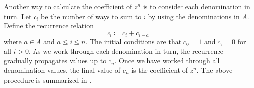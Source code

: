 Another way to calculate the coefficient of $z^n$ is to consider each
denomination in turn.  Let $c_i$ be the number of ways to sum to $i$
by using the denominations in $A$.  Define the recurrence relation
\begin{equation}
\label{eqn:sum2:recurrence_relation}
c_i
\coloneqq
c_i + c_{i-a}
\end{equation}
where $a \in A$ and $a \leq i \leq n$.  The initial conditions are
that $c_0 = 1$ and $c_i = 0$ for all $i > 0$.  As we work through each
denomination in turn, the recurrence
 gradually propagates values up
to $c_n$.  Once we have worked through all denomination values, the
final value of $c_n$ is the coefficient of $z^n$.  The above procedure
is summarized in .

\begin{algorithm}[!htbp]

\caption{%
  The number of ways to change money.
}
\label{alg:sum2:recurrence_relation}
\end{algorithm}
